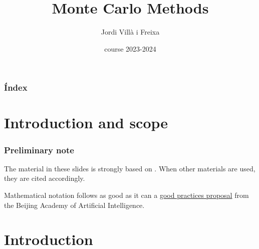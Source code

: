 \documentclass{beamer}
\title[Monte Carlo Methods]{Monte Carlo Methods} %
\author{Jordi Villà i Freixa} %
\institute[FCTE] %
{
Universitat de Vic - Universitat Central de Catalunya \\
Study Abroad\\ %
\medskip
\textit{jordi.villa@uvic.cat} %
}
\date{course 2023-2024}
\begin{document}
\begin{frame}
\titlepage %
\end{frame}

\begin{frame}
\frametitle{Índex} %
\tableofcontents %
\end{frame}

\section{Introduction and scope}
\begin{frame}
  \frametitle{Preliminary note}
  The material in these slides is strongly based on \cite{kroese2020}. When other materials are used, they are cited accordingly.

  Mathematical notation follows as good as it can a \href{https://ctan.math.utah.edu/ctan/tex-archive/macros/latex/contrib/mlmath/mlmath.pdf}{good practices proposal} from the Beijing Academy of Artificial Intelligence.
  \end{frame}

\section{Introduction} %

\end{document}
